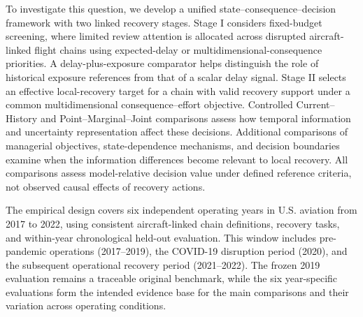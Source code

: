 To investigate this question, we develop a unified state--consequence--decision framework with two linked recovery stages. Stage I considers fixed-budget screening, where limited review attention is allocated across disrupted aircraft-linked flight chains using expected-delay or multidimensional-consequence priorities. A delay-plus-exposure comparator helps distinguish the role of historical exposure references from that of a scalar delay signal. Stage II selects an effective local-recovery target for a chain with valid recovery support under a common multidimensional consequence--effort objective. Controlled Current--History and Point--Marginal--Joint comparisons assess how temporal information and uncertainty representation affect these decisions. Additional comparisons of managerial objectives, state-dependence mechanisms, and decision boundaries examine when the information differences become relevant to local recovery. All comparisons assess model-relative decision value under defined reference criteria, not observed causal effects of recovery actions.

The empirical design covers six independent operating years in U.S. aviation from 2017 to 2022, using consistent aircraft-linked chain definitions, recovery tasks, and within-year chronological held-out evaluation. This window includes pre-pandemic operations (2017--2019), the COVID-19 disruption period (2020), and the subsequent operational recovery period (2021--2022). The frozen 2019 evaluation remains a traceable original benchmark, while the six year-specific evaluations form the intended evidence base for the main comparisons and their variation across operating conditions.


